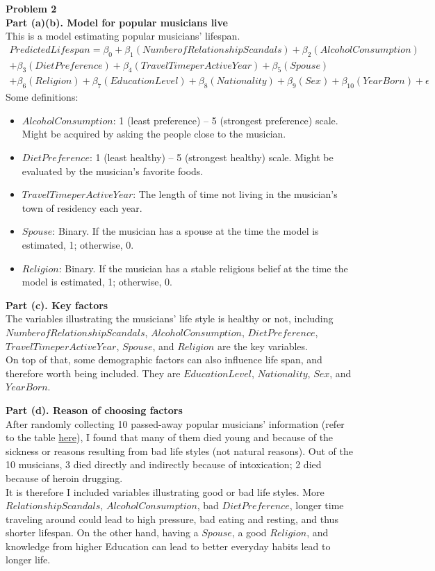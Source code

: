 \documentclass[letterpaper,10pt]{article}
\theoremstyle{definition}
\begin{document}
\noindent\textbf{Problem 2} \\
\noindent\textbf{Part (a)(b). Model for popular musicians live} \\
This is a model estimating popular musicians’ lifespan.
\begin{multline*}
Predicted Lifespan = \beta_{0} + \beta_{1}(Number of Relationship Scandals) + \beta_{2}(Alcohol Consumption) \\ +\beta_{3}(Diet Preference) + \beta_{4}(Travel Time per Active Year) + \beta_{5}(Spouse) \\ + \beta_{6}(Religion) + \beta_{7}(Education Level) + \beta_{8}(Nationality) + \beta_{9}(Sex) + \beta_{10}(Year Born) + \epsilon
\end{multline*}
Some definitions:
\begin{itemize}
\item $Alcohol Consumption$: 1 (least preference) – 5 (strongest preference) scale. Might be acquired by asking the people close to the musician.
\item $Diet Preference$: 1 (least healthy) – 5 (strongest healthy) scale. Might be evaluated by the musician’s favorite foods.
\item $Travel Time per Active Year$: The length of time not living in the musician’s town of residency each year.
\item $Spouse$: Binary. If the musician has a spouse at the time the model is estimated, 1; otherwise, 0.
\item $Religion$: Binary. If the musician has a stable religious belief at the time the model is estimated, 1; otherwise, 0.
\end{itemize}

\noindent\textbf{Part (c). Key factors} \\
The variables illustrating the musicians’ life style is healthy or not, including $Number of Relationship Scandals$, $Alcohol Consumption$, $Diet Preference$, $Travel Time per Active Year$, $Spouse$, and $Religion$ are the key variables. \\
On top of that, some demographic factors can also influence life span, and therefore worth being included. They are $Education Level$, $Nationality$, $Sex$, and $Year Born$.

\noindent\textbf{Part (d). Reason of choosing factors} \\
After randomly collecting 10 passed-away popular musicians’ information (refer to the table \href{https://airtable.com/shrNGSGC8SP2wTAi2}{here}), I found that many of them died young and because of the sickness or reasons resulting from bad life styles (not natural reasons). Out of the 10 musicians, 3 died directly and indirectly because of intoxication; 2 died because of heroin drugging. \\
It is therefore I included variables illustrating good or bad life styles. More $Relationship Scandals$, $Alcohol Consumption$, bad $Diet Preference$, longer time traveling around could lead to high pressure, bad eating and resting, and thus shorter lifespan. On the other hand, having a $Spouse$, a good $Religion$, and knowledge from higher Education can lead to better everyday habits lead to longer life.
\end{document}
